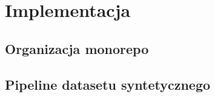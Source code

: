 \chapter{Implementacja}\label{ch:implementacja}


\section{Organizacja monorepo}\label{sec:monorepo}

%
%
%
%
%

\section{Pipeline datasetu syntetycznego}\label{sec:dataset-pipeline}

